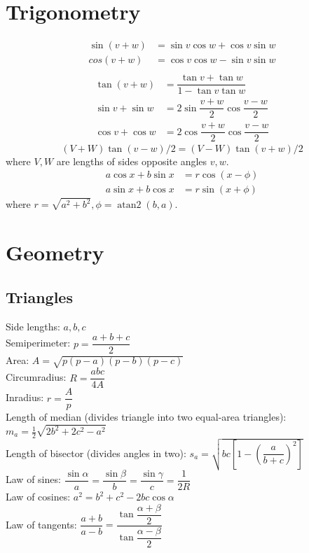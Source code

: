 \documentclass[11pt]{article}
\begin{document}
\begin{multicols}{3}
\section{Trigonometry}
\begin{align*}
\sin(v+w)&{}=\sin v\cos w+\cos v\sin w\\
cos(v+w)&{}=\cos v\cos w-\sin v\sin w\\
\end{align*}
\begin{align*}
\tan(v+w)&{}=\dfrac{\tan v+\tan w}{1-\tan v\tan w}\\
\sin v+\sin w&{}=2\sin\dfrac{v+w}{2}\cos\dfrac{v-w}{2}\\
\cos v+\cos w&{}=2\cos\dfrac{v+w}{2}\cos\dfrac{v-w}{2}
\end{align*}
\[ (V+W)\tan(v-w)/2{}=(V-W)\tan(v+w)/2 \]
where $V, W$ are lengths of sides opposite angles $v, w$.
\begin{align*}
	a\cos x+b\sin x&=r\cos(x-\phi)\\
	a\sin x+b\cos x&=r\sin(x+\phi)
\end{align*}
where $r=\sqrt{a^2+b^2}, \phi=\operatorname{atan2}(b,a)$.

\section{Geometry}

\subsection{Triangles}
Side lengths: $a,b,c$\\
Semiperimeter: $p=\dfrac{a+b+c}{2}$\\
Area: $A=\sqrt{p(p-a)(p-b)(p-c)}$\\
Circumradius: $R=\dfrac{abc}{4A}$\\
Inradius: $r=\dfrac{A}{p}$\\
Length of median (divides triangle into two equal-area triangles): $m_a=\tfrac{1}{2}\sqrt{2b^2+2c^2-a^2}$\\
Length of bisector (divides angles in two): $s_a=\sqrt{bc\left[1-\left(\dfrac{a}{b+c}\right)^2\right]}$\\
Law of sines: $\dfrac{\sin\alpha}{a}=\dfrac{\sin\beta}{b}=\dfrac{\sin\gamma}{c}=\dfrac{1}{2R}$\\
Law of cosines: $a^2=b^2+c^2-2bc\cos\alpha$\\
Law of tangents: $\dfrac{a+b}{a-b}=\dfrac{\tan\dfrac{\alpha+\beta}{2}}{\tan\dfrac{\alpha-\beta}{2}}$\\


\end{multicols}
\end{document}
